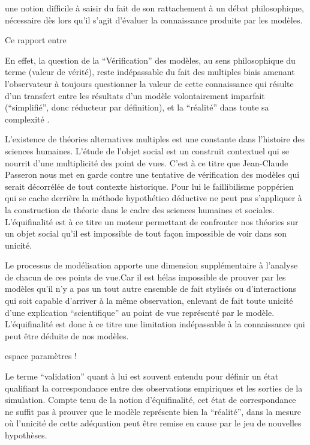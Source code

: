  une notion difficile à saisir du fait de son rattachement à un débat philosophique, nécessaire dès lors qu'il s'agit d'évaluer la connaissance produite par les modèles.

Ce rapport entre  


En effet, la question de la \enquote{Vérification} des modèles, au sens philosophique du terme (valeur de vérité), reste indépassable du fait des multiples biais amenant l'observateur à toujours questionner la valeur de cette connaissance qui résulte d'un transfert entre les résultats d'un modèle volontairement imparfait (\enquote{simplifié}, donc réducteur par définition), et la \enquote{réalité} dans toute sa complexité \autocite{OSullivan2004}.


L’existence de théories alternatives multiples est une constante dans l’histoire des sciences humaines. L'étude de l'objet social est un construit contextuel qui se nourrit d'une multiplicité des point de vues. C'est à ce titre que Jean-Claude Passeron \autocite{Passeron2006} nous met en garde contre une tentative de vérification des modèles qui serait décorrélée de tout contexte historique. Pour lui le faillibilisme poppérien qui se cache derrière la méthode hypothético déductive ne peut pas s'appliquer à la construction de théorie dans le cadre des sciences humaines et sociales. L'équifinalité est à ce titre un moteur permettant de confronter nos théories sur un objet social  qu'il est impossible de tout façon impossible de voir dans son unicité. 

Le processus de modélisation apporte une dimension supplémentaire à l'analyse de chacun de ces points de vue.Car il est hélas impossible de prouver par les modèles qu'il n'y a pas un tout autre ensemble de fait stylisés ou d'interactions qui soit capable d'arriver à la même observation, enlevant de fait toute unicité d’une explication \enquote{scientifique} au point de vue représenté par le modèle. L'équifinalité est donc à ce titre une limitation indépassable à la connaissance qui peut être déduite de nos modèles.

espace paramètres !

Le terme \enquote{validation} quant à lui est souvent entendu pour définir un état qualifiant la correspondance entre des observations empiriques et les sorties de la simulation. Compte tenu de la notion d'équifinalité, cet état de correspondance ne suffit pas à prouver que le modèle représente bien la \enquote{réalité}, dans la mesure où l’unicité de cette adéquation peut être remise en cause par le jeu de nouvelles hypothèses. 


